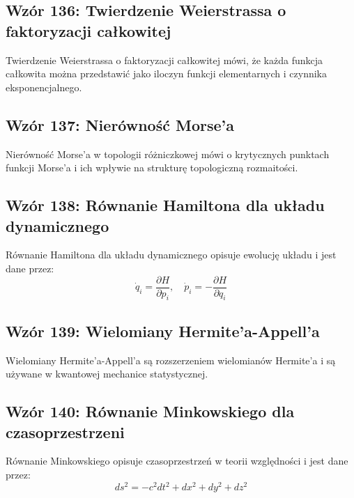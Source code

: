 \documentclass{article}
\begin{document}
\subsection*{Wzór 136: Twierdzenie Weierstrassa o faktoryzacji całkowitej}

Twierdzenie Weierstrassa o faktoryzacji całkowitej mówi, że każda funkcja całkowita można przedstawić jako iloczyn funkcji elementarnych i czynnika eksponencjalnego.

\subsection*{Wzór 137: Nierówność Morse'a}

Nierówność Morse'a w topologii różniczkowej mówi o krytycznych punktach funkcji Morse'a i ich wpływie na strukturę topologiczną rozmaitości.

\subsection*{Wzór 138: Równanie Hamiltona dla układu dynamicznego}

Równanie Hamiltona dla układu dynamicznego opisuje ewolucję układu i jest dane przez:
\[ \dot{q}_i = \frac{\partial H}{\partial p_i}, \quad \dot{p}_i = -\frac{\partial H}{\partial q_i} \]

\subsection*{Wzór 139: Wielomiany Hermite'a-Appell'a}

Wielomiany Hermite'a-Appell'a są rozszerzeniem wielomianów Hermite'a i są używane w kwantowej mechanice statystycznej.

\subsection*{Wzór 140: Równanie Minkowskiego dla czasoprzestrzeni}

Równanie Minkowskiego opisuje czasoprzestrzeń w teorii względności i jest dane przez:
\[ ds^2 = -c^2dt^2 + dx^2 + dy^2 + dz^2 \]
\end{document}
